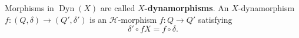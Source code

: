 Morphisms in $\operatorname{Dyn}(X)$ are called \textbf{$X$-dynamorphisms}. An $X$-dynamorphism $f: (Q, \delta) \to (Q', \delta')$ is an $\mathcal{H}$-morphism $f: Q \to Q'$ satisfying
$$\delta' \circ fX = f \circ \delta.$$
